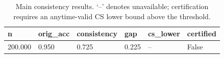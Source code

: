 \begin{table}[t]
\centering
\begin{tabular}{llllll}
\toprule
n & orig_acc & consistency & gap & cs_lower & certified \\
\midrule
200.000 & 0.950 & 0.725 & 0.225 & -- & False \\
\bottomrule
\end{tabular}
\caption{Main consistency results. `--' denotes unavailable; certification requires an anytime-valid CS lower bound above the threshold.}
\end{table}

